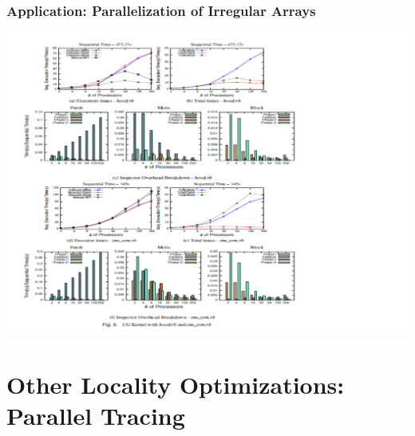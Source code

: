 \documentclass{beamer}
\begin{document}
\begin{frame}[fragile,t]
  \frametitle{Application: Parallelization of Irregular Arrays}

\center\includegraphics[width=59ex]{Figures/ParInspExec}

\end{frame}


\section{Other Locality Optimizations: Parallel Tracing}

\begin{frame}[fragile]
	\tableofcontents[currentsection]
\end{frame}
\end{document}
